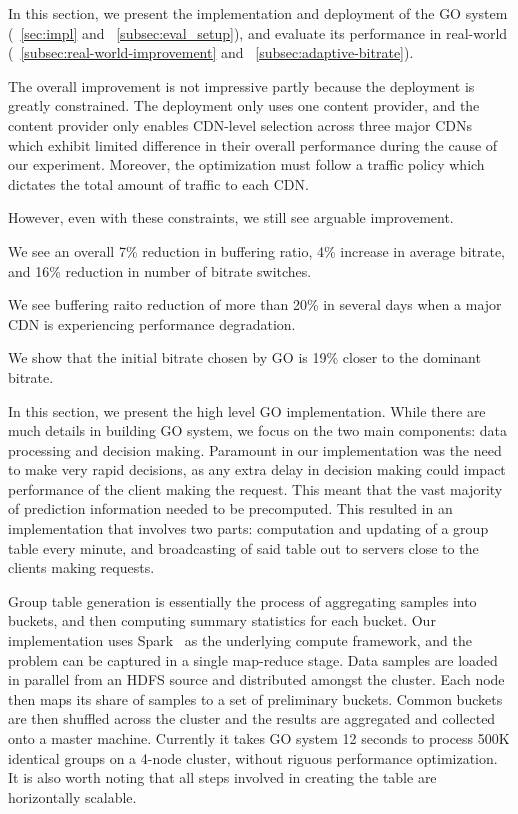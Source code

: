\label{sec:eval}

In this section, we present the implementation and deployment of the GO system (\Section~\ref{sec:impl} and ~\ref{subsec:eval_setup}), and evaluate its performance in real-world (\Section~\ref{subsec:real-world-improvement} and ~\ref{subsec:adaptive-bitrate}). 

The overall improvement is not impressive partly because the deployment is greatly constrained. The deployment only uses one content provider, and the content provider only enables CDN-level selection across three major CDNs which exhibit limited difference in their overall performance during the cause of our experiment. Moreover, the optimization must follow a traffic policy which dictates the total amount of traffic to each CDN. 

However, even with these constraints, we still see arguable improvement. 

\begin{packedenumerate}
    \item We see an overall 7\% reduction in buffering ratio, 4\% increase in average bitrate, and 16\% reduction in number of bitrate switches.
    \item We see buffering raito reduction of more than 20\% in several days when a major CDN is experiencing performance degradation.
    \item We show that the initial bitrate chosen by GO is 19\% closer to the dominant bitrate.
\end{packedenumerate}

\label{sec:impl}
In this section, we present the high level GO implementation. While there are much details in building GO system, we focus on the two main components: data processing and decision making. Paramount in our implementation was the need to make very rapid decisions, as any extra delay in decision making could impact performance of the client making the request. This meant that the vast majority of prediction information needed to be precomputed. This resulted in an implementation that involves two parts: computation and updating of a group table every minute, and broadcasting of said table out to servers close to the clients making requests.

 Group table generation is essentially the process of aggregating samples into buckets, and then computing summary statistics for each bucket.  
Our implementation uses Spark~\cite{spark} as the underlying compute framework, and the problem can be captured in a single map-reduce stage. 
Data samples are loaded in parallel from an HDFS source and distributed amongst the cluster. Each node then maps its share of samples to a set of 
preliminary buckets. Common buckets are then shuffled across the cluster and the results are aggregated and collected onto a master machine. 
Currently it takes GO system 12 seconds to process 500K identical groups on a 4-node cluster, without riguous performance optimization.
It is also worth noting that all steps involved in creating the table are horizontally scalable.


